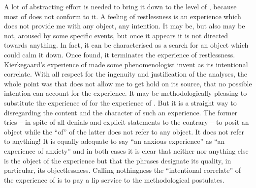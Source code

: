 A lot of abstracting effort is needed to bring it down to the level of
, because most of  does not conform to it.  A
feeling of restlessness is an experience which does not provide me with any
object, any intention.  It may be, but also may be not, aroused by some specific
events, but once it appears it is not directed towards anything.  In fact, it
can be characterised as a search for an object which could calm it down.  Once
found, it terminates the experience of restlessness.  Kierkegaard's experience of
 made some phenomenologist invent  as its intentional
correlate.  With all respect for the ingenuity and justification of the
analyses, the whole point was that  does not allow me to get hold on
its source, that no possible intention can account for the
experience. It may be methodologically pleasing to substitute the experience
of  for the experience of .  But it is a straight
way to disregarding the content and the character of such an experience.  The
former tries -- in spite of all denials and explicit statements to the contrary
-- to posit an object while the ``of'' of the latter does not refer to any
object.  It does not refer to anything!  It is equally adequate to say ``an
anxious experience'' as ``an experience of anxiety'' and in both cases it is
clear that neither  nor anything else is the object of the
experience but that the phrases designate its quality, in particular, its
objectlessness.  Calling nothingness the
``intentional correlate'' of the experience of  is to pay a lip
service to the  methodological postulates.

